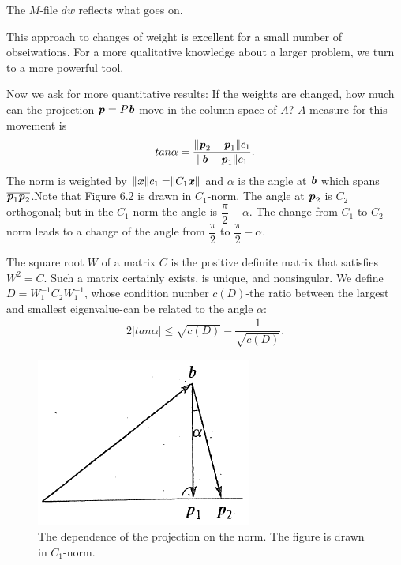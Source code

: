 The $M$-file $dw$ reflects what goes on.

This approach to changes of weight is excellent for a small number of obseiwations. For a more qualitative knowledge about a larger problem, we turn to a more powerful tool.

Now we ask for more quantitative results: If the weights are changed, how much can the projection $\textbf{\textit{p}}=P\textbf{\textit{b}}$ move in the column space of $A$? $A$ measure for this movement is
\begin{align}
tan \alpha = \dfrac{\rVert \textbf{\textit{p}}_{2} - \textbf{\textit{p}}_{1}\rVert c_{1}}{\rVert \textbf{\textit{b}} - \textbf{\textit{p}}_{1}\rVert c_{1}}.
\end{align}
The norm is weighted by $ \rVert \textbf{\textit{x}} \rVert c_{1}  = \rVert  C_{1}\textbf{\textit{x}} \rVert$ and $ \alpha$ is the angle at $\textbf{\textit{b}}$ which spans $ \overline{\textbf{\textit{p}}_{1}\textbf{\textit{p}}_{2}}$.Note that Figure 6.2 is drawn in $C_{1}$-norm. The angle at $\textbf{\textit{p}}_{2}$ is $C_{2}$ orthogonal; but in the $C_{1}$-norm the angle is $ \dfrac{\pi}{2} - \alpha$. The change from $C_{1}$ to $C_{2}$-norm leads to a change of the angle from $ \dfrac{\pi}{2}$ to $ \dfrac{\pi}{2} - \alpha$.

The square root $W$ of a matrix $C$ is the positive definite matrix that satisfies $W^{2}=C$. Such a matrix certainly exists, is unique, and nonsingular. We define $ D = W^{-1}_{1}C_{2}W^{-1}_{1}$, whose condition number $c(D)$-the ratio between the largest and smallest eigenvalue-can be related to the angle $ \alpha$:
\begin{align}
2\lvert tan\alpha \rvert \leq \sqrt{c(D)} - \dfrac{1}{\sqrt{c(D)}}.
\end{align}
\begin{figure}[!h]
	\centering
	\includegraphics[height=0.23\linewidth]{TeX_files/Part02/chapter06/image/6-2}
	\caption{The dependence of the projection on the norm. The figure is drawn in $C_{1}$-norm.}
\end{figure}

